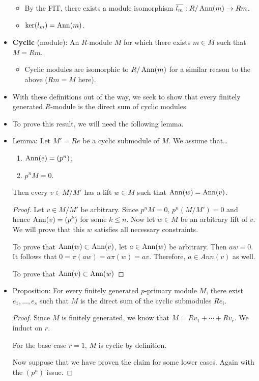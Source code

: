 \documentclass[../notes.tex]{subfiles}
\begin{document}
\begin{itemize}
    \begin{itemize}
        \item By the FIT, there exists a module isomorphism $\overline{l_m}:R/\operatorname{Ann}(m)\to Rm$.
        \item $\ker(l_m)=\operatorname{Ann}(m)$.
    \end{itemize}
    \item \textbf{Cyclic} (module): An $R$-module $M$ for which there exists $m\in M$ such that $M=Rm$.
    \begin{itemize}
        \item Cyclic modules are isomorphic to $R/\operatorname{Ann}(m)$ for a similar reason to the above ($Rm=M$ here).
    \end{itemize}
    \item With these definitions out of the way, we seek to show that every finitely generated $R$-module is the direct sum of cyclic modules.
    \item To prove this result, we will need the following lemma.
    \item Lemma: Let $M'=Re$ be a cyclic submodule of $M$. We assume that\dots
    \begin{enumerate}[label={(\roman*)}]
        \item $\operatorname{Ann}(e)=(p^n)$;
        \item $p^nM=0$.
    \end{enumerate}
    Then every $v\in M/M'$ has a lift $w\in M$ such that $\operatorname{Ann}(w)=\operatorname{Ann}(v)$.
    \begin{proof}
        Let $v\in M/M'$ be arbitrary. Since $p^nM=0$, $p^n(M/M')=0$ and hence $\operatorname{Ann}(v)=(p^k)$ for some $k\leq n$. Now let $w\in M$ be an arbitrary lift of $v$. We will prove that this $w$ satisfies all necessary constraints.\par
        To prove that $\operatorname{Ann}(w)\subset\operatorname{Ann}(v)$, let $a\in\operatorname{Ann}(w)$ be arbitrary. Then $aw=0$. It follows that $0=\pi(aw)=a\pi(w)=av$. Therefore, $a\in Ann(v)$ as well.\par
        To prove that $\operatorname{Ann}(v)\subset\operatorname{Ann}(w)$
    \end{proof}
    \item Proposition: For every finitely generated $p$-primary module $M$, there exist $e_1,\dots,e_s$ such that $M$ is the direct sum of the cyclic submodules $Re_i$.
    \begin{proof}
        Since $M$ is finitely generated, we know that $M=Rv_1+\cdots+Rv_r$. We induct on $r$.\par
        For the base case $r=1$, $M$ is cyclic by definition.\par
        Now suppose that we have proven the claim for some lower cases. Again with the $(p^n)$ issue.
    \end{proof}
\end{itemize}
\end{document}
